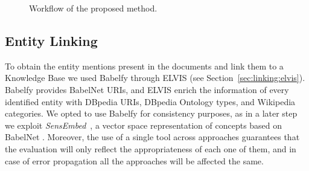 \begin{figure}[!htp]
\centerline{}
\caption{Workflow of the proposed method.}
\label{fig:similarity:methodology}
\end{figure}

\subsection{Entity Linking}

To obtain the entity mentions present in the documents and link them to a Knowledge Base we used Babelfy \citep{Moroetal2014b} through ELVIS (see Section~\ref{sec:linking:elvis}). Babelfy provides BabelNet URIs, and ELVIS enrich the information of every identified entity with DBpedia URIs, DBpedia Ontology types, and Wikipedia categories.
We opted to use Babelfy for consistency purposes, as in a later step we exploit \textit{SensEmbed}~\citep{Iacobaccietal2015}, a vector space representation of concepts based on BabelNet \citep{Navigli2010}. Moreover, the use of a single tool across approaches guarantees that the evaluation will only reflect the appropriateness of each one of them, and in case of error propagation all the approaches will be affected the same.

%


